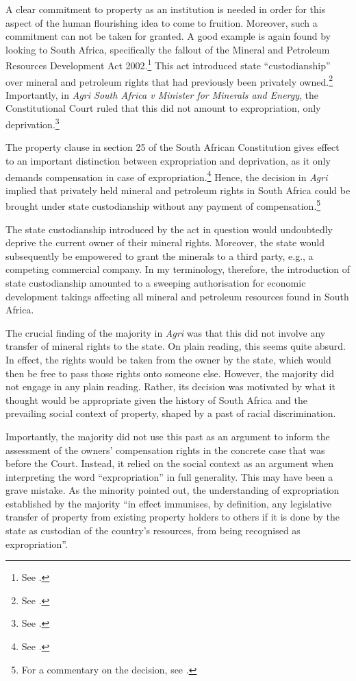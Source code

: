 A clear commitment to property as an institution is needed in order for this aspect of the human flourishing idea to come to fruition. Moreover, such a commitment can not be taken for granted. A good example is again found by looking to South Africa, specifically the fallout of the Mineral and Petroleum Resources Development Act 2002.\footnote{See \cite{mrdpa02}.} This act introduced state ``custodianship'' over mineral and petroleum rights that had previously been privately owned.\footnote{See \cite[3]{mrdpa02}.} Importantly, in {\it Agri South Africa v Minister for Minerals and Energy}, the Constitutional Court ruled that this did not amount to expropriation, only deprivation.\footnote{See \cite{agri13}.} 

The property clause in section 25 of the South African Constitution gives effect to an important distinction between expropriation and deprivation, as it only demands compensation in case of expropriation.\footnote{See \cite[18-19]{walt11}.} Hence, the decision in {\it Agri} implied that privately held mineral and petroleum rights in South Africa could be brought under state custodianship without any payment of compensation.\footnote{For a commentary on the decision, see \cite{marais15a,marais15b}.}

The state custodianship introduced by the act in question would undoubtedly deprive the current owner of their mineral rights. Moreover, the state would subsequently be empowered to grant the minerals to a third party, e.g., a competing commercial company. In my terminology, therefore, the introduction of state custodianship amounted to a sweeping authorisation for economic development takings affecting all mineral and petroleum resources found in South Africa.

The crucial finding of the majority in {\it Agri} was that this did not involve any transfer of mineral rights to the state. On plain reading, this seems quite absurd. In effect, the rights would be taken from the owner by the state, which would then be free to pass those rights onto someone else. However, the majority did not engage in any plain reading. Rather, its decision was motivated by what it thought would be appropriate given the history of South Africa and the prevailing social context of property, shaped by a past of racial discrimination.

Importantly, the majority did not use this past as an argument to inform the assessment of the owners' compensation rights in the concrete case that was before the Court. Instead, it relied on the social context as an argument when interpreting the word ``expropriation'' in full generality. This may have been a grave mistake. As the minority pointed out, the understanding of expropriation established by the majority ``in effect immunises, by definition, any legislative transfer of property from existing property holders to others if it is done by the state as custodian of the country's resources, from being recognised as expropriation''.

